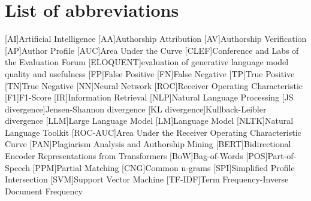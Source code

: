 \chapter*{List of abbreviations}

\begin{acronym}[XXXXXXXXX]
    [AI]{Artificial Intelligence}
    [AA]{Authorship Attribution}
    [AV]{Authorship Verification}
    [AP]{Author Profile}
    [AUC]{Area Under the Curve}
    [CLEF]{Conference and Labs of the Evaluation Forum}
    [ELOQUENT]{evaluation of generative language model quality and usefulness}
    [FP]{False Positive}
    [FN]{False Negative}
    [TP]{True Positive}
    [TN]{True Negative}
    [NN]{Neural Network}
    [ROC]{Receiver Operating Characteristic}
    [F1]{F1-Score}
    [IR]{Information Retrieval}
    [NLP]{Natural Language Processing}
    [JS divergence]{Jensen-Shannon divergence}
    [KL divergence]{Kullback-Leibler divergence}
    [LLM]{Large Language Model}
    [LM]{Language Model}
    [NLTK]{Natural Language Toolkit}
    [ROC-AUC]{Area Under the Receiver Operating Characteristic Curve}
    [PAN]{Plagiarism Analysis and Authorship Mining} %
    [BERT]{Bidirectional Encoder Representations from Transformers}
    [BoW]{Bag-of-Words}
    [POS]{Part-of-Speech}
    [PPM]{Partial Matching}
    [CNG]{Common n-grams}
    [SPI]{Simplified Profile Intersection}
    [SVM]{Support Vector Machine}
    [TF-IDF]{Term Frequency-Inverse Document Frequency}

\end{acronym}
